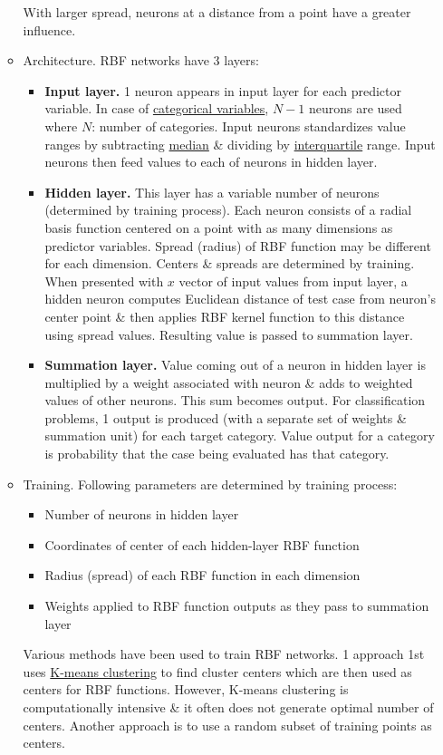 \documentclass{article}
\begin{document}
\begin{itemize}
\begin{itemize}
		With larger spread, neurons at a distance from a point have a greater influence.
		\item {\sf Architecture.} RBF networks have 3 layers:
		\begin{itemize}
			\item {\bf Input layer.} 1 neuron appears in input layer for each predictor variable. In case of \href{https://en.wikipedia.org/wiki/Categorical_variable}{categorical variables}, $N - 1$ neurons are used where $N$: number of categories. Input neurons standardizes value ranges by subtracting \href{https://en.wikipedia.org/wiki/Median}{median} \& dividing by \href{https://en.wikipedia.org/wiki/Interquartile_range}{interquartile} range. Input neurons then feed values to each of neurons in hidden layer.
			\item {\bf Hidden layer.} This layer has a variable number of neurons (determined by training process). Each neuron consists of a radial basis function centered on a point with as many dimensions as predictor variables. Spread (radius) of RBF function may be different for each dimension. Centers \& spreads are determined by training. When presented with $x$ vector of input values from input layer, a hidden neuron computes Euclidean distance of test case from neuron's center point \& then applies RBF kernel function to this distance using spread values. Resulting value is passed to summation layer.
			\item {\bf Summation layer.} Value coming out of a neuron in hidden layer is multiplied by a weight associated with neuron \& adds to weighted values of other neurons. This sum becomes output. For classification problems, 1 output is produced (with a separate set of weights \& summation unit) for each target category. Value output for a category is probability that the case being evaluated has that category.
		\end{itemize}
		\item {\sf Training.} Following parameters are determined by training process:
		\begin{itemize}
			\item Number of neurons in hidden layer
			\item Coordinates of center of each hidden-layer RBF function
			\item Radius (spread) of each RBF function in each dimension
			\item Weights applied to RBF function outputs as they pass to summation layer
		\end{itemize}
		Various methods have been used to train RBF networks. 1 approach 1st uses \href{https://en.wikipedia.org/wiki/K-means_clustering}{K-means clustering} to find cluster centers which are then used as centers for RBF functions. However, K-means clustering is computationally intensive \& it often does not generate optimal number of centers. Another approach is to use a random subset of training points as centers.
		

\end{itemize}
\end{itemize}
\end{document}
